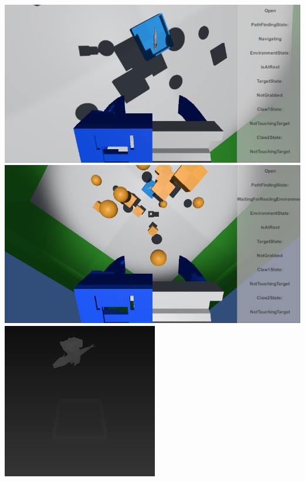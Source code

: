 \includegraphics[width=\linewidth]{figures/simulation/game-mid}
\includegraphics[width=\linewidth]{figures/simulation/game-start}
\includegraphics[width=\linewidth]{figures/simulation/grabbed-depth}
